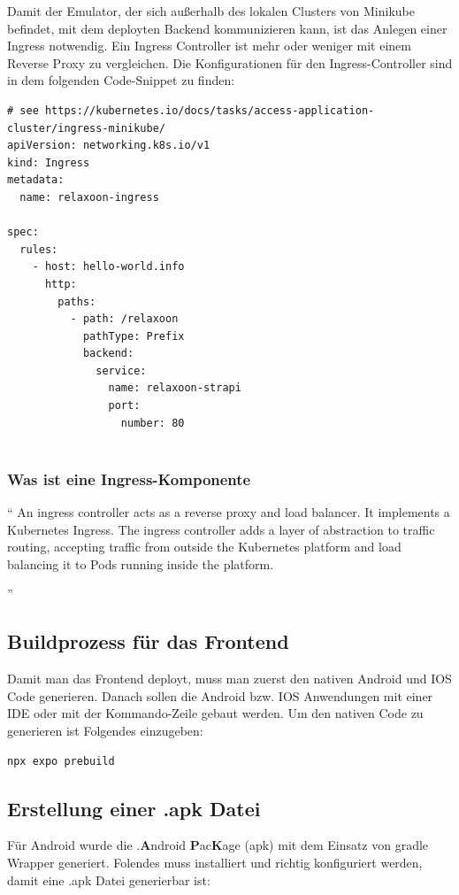 Damit der Emulator, der sich außerhalb des lokalen Clusters von Minikube befindet,
mit dem deployten Backend kommunizieren kann,
ist das Anlegen einer Ingress notwendig. Ein Ingress Controller ist mehr oder weniger mit einem Reverse Proxy zu vergleichen.
Die Konfigurationen für den Ingress-Controller sind in dem folgenden Code-Snippet zu finden:

\begin{lstlisting}[caption=ingress-contrller]
  # see https://kubernetes.io/docs/tasks/access-application-cluster/ingress-minikube/
apiVersion: networking.k8s.io/v1
kind: Ingress
metadata:
  name: relaxoon-ingress

spec:
  rules:
    - host: hello-world.info
      http:
        paths:
          - path: /relaxoon
            pathType: Prefix
            backend:
              service:
                name: relaxoon-strapi
                port:
                  number: 80
  
\end{lstlisting}




\subsubsection{Was ist eine Ingress-Komponente}
``
An ingress controller acts as a reverse proxy and load balancer.
It implements a Kubernetes Ingress.
The ingress controller adds a layer of abstraction to traffic routing,
accepting traffic from outside the Kubernetes platform and load balancing
it to Pods running inside the platform.

''
\cite{ingress}

\subsection{Buildprozess für das Frontend}

Damit man das Frontend deployt, muss man zuerst den nativen Android und IOS Code generieren.
Danach sollen die Android bzw. IOS Anwendungen mit einer IDE oder mit der Kommando-Zeile gebaut werden.
Um den nativen Code zu generieren ist Folgendes einzugeben:
\begin{lstlisting}[language=Bash,caption=generate android and ios]
npx expo prebuild
\end{lstlisting}





\subsection{Erstellung einer .apk Datei}
Für Android wurde die .\textbf{A}ndroid \textbf{P}ac\textbf{K}age (apk)  mit dem Einsatz von gradle Wrapper generiert.
Folendes muss installiert und richtig konfiguriert werden, damit  eine .apk Datei generierbar ist:



